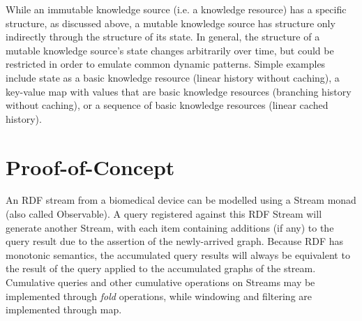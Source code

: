 \documentclass[runningheads]{llncs}
\begin{document}
While an immutable knowledge source (i.e. a knowledge resource) has a specific structure, as discussed above, a mutable knowledge source has structure only indirectly through the structure of its state. In general, the structure of a mutable knowledge source's state changes arbitrarily over time, but could be restricted in order to emulate common dynamic patterns. Simple examples include state as a basic knowledge resource (linear history without caching), a key-value map with values that are basic knowledge resources (branching history without caching), or a sequence of basic knowledge resources (linear cached history). 



\vspace{-0.4cm}
\section{Proof-of-Concept}
\label{sec:proof}

An RDF stream from a biomedical device can be modelled using a Stream monad (also called Observable).
A query registered against this RDF Stream will generate another Stream, with each item containing additions (if any) to the query result due to the assertion of the newly-arrived graph.
Because RDF has monotonic semantics, the accumulated query results will always be equivalent to the result of the query applied to the accumulated graphs of the stream.
Cumulative queries and other cumulative operations on Streams may be implemented through \emph{fold} operations, while windowing and filtering are implemented through map.
\end{document}
